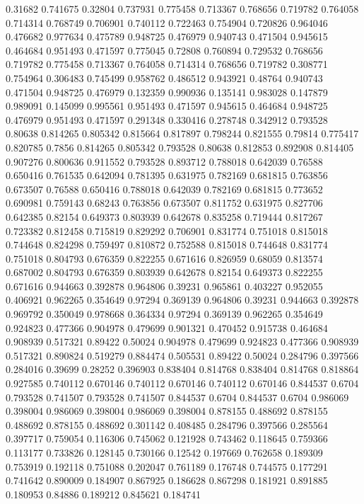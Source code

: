 0.31682 0.741675
0.32804 0.737931
0.775458 0.713367
0.768656 0.719782
0.764058 0.714314
0.768749 0.706901
0.740112 0.722463
0.754904 0.720826
0.964046 0.476682
0.977634 0.475789
0.948725 0.476979
0.940743 0.471504
0.945615 0.464684
0.951493 0.471597
0.775045 0.72808
0.760894 0.729532
0.768656 0.719782
0.775458 0.713367
0.764058 0.714314
0.768656 0.719782
0.308771 0.754964
0.306483 0.745499
0.958762 0.486512
0.943921 0.48764
0.940743 0.471504
0.948725 0.476979
0.132359 0.990936
0.135141 0.983028
0.147879 0.989091
0.145099 0.995561
0.951493 0.471597
0.945615 0.464684
0.948725 0.476979
0.951493 0.471597
0.291348 0.330416
0.278748 0.342912
0.793528 0.80638
0.814265 0.805342
0.815664 0.817897
0.798244 0.821555
0.79814 0.775417
0.820785 0.7856
0.814265 0.805342
0.793528 0.80638
0.812853 0.892908
0.814405 0.907276
0.800636 0.911552
0.793528 0.893712
0.788018 0.642039
0.76588 0.650416
0.761535 0.642094
0.781395 0.631975
0.782169 0.681815
0.763856 0.673507
0.76588 0.650416
0.788018 0.642039
0.782169 0.681815
0.773652 0.690981
0.759143 0.68243
0.763856 0.673507
0.811752 0.631975
0.827706 0.642385
0.82154 0.649373
0.803939 0.642678
0.835258 0.719444
0.817267 0.723382
0.812458 0.715819
0.829292 0.706901
0.831774 0.751018
0.815018 0.744648
0.824298 0.759497
0.810872 0.752588
0.815018 0.744648
0.831774 0.751018
0.804793 0.676359
0.822255 0.671616
0.826959 0.68059
0.813574 0.687002
0.804793 0.676359
0.803939 0.642678
0.82154 0.649373
0.822255 0.671616
0.944663 0.392878
0.964806 0.39231
0.965861 0.403227
0.952055 0.406921
0.962265 0.354649
0.97294 0.369139
0.964806 0.39231
0.944663 0.392878
0.969792 0.350049
0.978668 0.364334
0.97294 0.369139
0.962265 0.354649
0.924823 0.477366
0.904978 0.479699
0.901321 0.470452
0.915738 0.464684
0.908939 0.517321
0.89422 0.50024
0.904978 0.479699
0.924823 0.477366
0.908939 0.517321
0.890824 0.519279
0.884474 0.505531
0.89422 0.50024
0.284796 0.397566
0.284016 0.39699
0.28252 0.396903
0.838404 0.814768
0.838404 0.814768
0.818864 0.927585
0.740112 0.670146
0.740112 0.670146
0.740112 0.670146
0.844537 0.6704
0.793528 0.741507
0.793528 0.741507
0.844537 0.6704
0.844537 0.6704
0.986069 0.398004
0.986069 0.398004
0.986069 0.398004
0.878155 0.488692
0.878155 0.488692
0.878155 0.488692
0.301142 0.408485
0.284796 0.397566
0.285564 0.397717
0.759054 0.116306
0.745062 0.121928
0.743462 0.118645
0.759366 0.113177
0.733826 0.128145
0.730166 0.12542
0.197669 0.762658
0.189309 0.753919
0.192118 0.751088
0.202047 0.761189
0.176748 0.744575
0.177291 0.741642
0.890009 0.184907
0.867925 0.186628
0.867298 0.181921
0.891885 0.180953
0.84886 0.189212
0.845621 0.184741
